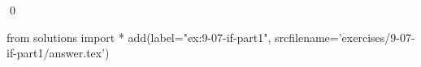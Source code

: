 
\begin{ex}
  \label{ex:9-07-if-part1}
  
  \qed
\end{ex}
\begin{python0}
from solutions import *
add(label="ex:9-07-if-part1",
    srcfilename='exercises/9-07-if-part1/answer.tex')
\end{python0}
